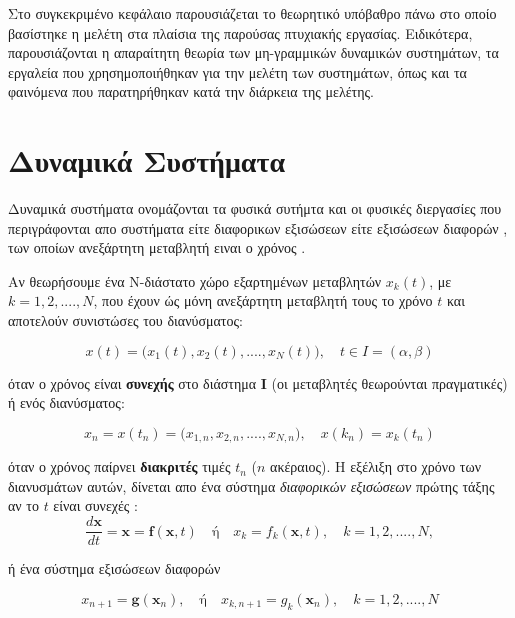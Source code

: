 Στο συγκεκριμένο κεφάλαιο παρουσιάζεται το θεωρητικό υπόβαθρο πάνω στο οποίο βασίστηκε η μελέτη στα πλαίσια της παρούσας πτυχιακής εργασίας.
Ειδικότερα, παρουσιάζονται η απαραίτητη θεωρία των μη-γραμμικών δυναμικών συστημάτων, τα εργαλεία που χρησημοποιήθηκαν για την μελέτη των συστημάτων, όπως και τα φαινόμενα που παρατηρήθηκαν κατά την διάρκεια της μελέτης.

\section{Δυναμικά Συστήματα}

Δυναμικά συστήματα ονομάζονται τα φυσικά συτήμτα και οι φυσικές διεργασίες που περιγράφονται απο συστήματα είτε διαφορικων εξισώσεων είτε εξισώσεων διαφορών , των οποίων ανεξάρτητη μεταβλητή ειναι ο χρόνος \cite{b1}.

Αν θεωρήσουμε ένα Ν-διάστατο χώρο εξαρτημένων μεταβλητών $x_k(t)$, με $k =1, 2, ...., N$, που έχουν ώς μόνη ανεξάρτητη μεταβλητή τους το χρόνο  $t$ και αποτελούν συνιστώσες του διανύσματος:

\begin{equation}	
	x (t)= \bigl( x_1(t) , x_2(t), .... , x_N(t) \bigl) ,\quad t \in I= (α,β)
	\label{m:g1}
\end{equation}

όταν ο χρόνος είναι \textbf{συνεχής} στο διάστημα \textbf{I} (οι μεταβλητές θεωρούνται πραγματικές) ή ενός διανύσματος:

\begin{equation}	
	x_n = x(t_n)= \bigl( x_{1,n}, x_{2,n}, .... , x_{N,n} \bigl) , \quad x(k_n)= x_k(t_n)
	\label{m:g2}
\end{equation}

όταν ο χρόνος παίρνει \textbf{διακριτές} τιμές $t_n$ ($n$ ακέραιος).
Η εξέλιξη στο χρόνο των διανυσμάτων αυτών, δίνεται απο ένα σύστημα 
\emph{διαφορικών εξισώσεων} πρώτης τάξης αν το $t$ είναι συνεχές :
\begin{equation}
	\frac{d\textbf{x}}{dt} = \textbf{x} = \textbf{f}(\textbf{x},t)  \quad  \text{ή} \quad  
	x_k = f_k (\textbf{x},t), \quad k=1,2, .... , N ,
	\label{m:g3}
\end{equation}

ή ένα σύστημα εξισώσεων διαφορών

\begin{equation}	
	x_{n+1} = \textbf{g}(\textbf{x}_n), \quad \text{ή}  \quad x_{k,n+1}= g_k(\textbf{x}_n), \quad k=1,2, .... , N
	\label{m:g4}
\end{equation}

